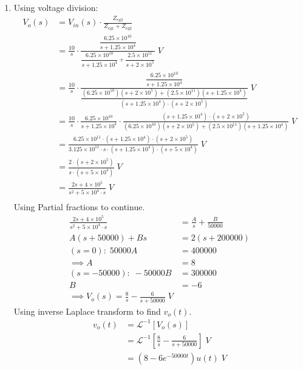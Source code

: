 \begin{enumerate}
	\item{
		Using voltage division:
		\begin{align*}
		V_o(s) &= V_{in}(s) \cdot \frac{Z_{eq2}}{Z_{eq1} + Z_{eq2}}\\
		&= \frac{10}{s} \cdot \frac{\dfrac{6.25 \times 10^{10}}				%
		{s + 1.25 \times 10^4}}{\dfrac{6.25 \times 10^{10}}					%
		{s + 1.25 \times 10^4} + \dfrac{2.5 \times 10^{11}}					%
		{s + 2 \times 10^5}} \; V\\
		&= \frac{10}{s} \cdot \frac{\dfrac{6.25 \times 10^{10}}             %
		{s+1.25 \times 10^4}}{\dfrac{(6.25 \times 10^{10})					%
		(s + 2\times 10^5) + (2.5 \times 10^{11})(s + 1.25 \times 10^4)}	%
		{(s + 1.25 \times 10^4)\cdot(s + 2 \times 10^5)}} \; V\\
		&= \frac{10}{s} \cdot \frac{6.25 \times 10^{10}}            
		{s+1.25 \times 10^4} \cdot \frac{(s + 1.25 \times 10^4)
		\cdot(s + 2 \times 10^5)}{(6.25 \times 10^{10})
		(s + 2\times 10^5) + (2.5 \times 10^{11})
		(s + 1.25 \times 10^4)} \; V\\
		&= \frac{6.25 \times 10^{11} \cdot (s + 1.25 \times 10^4) \cdot 
		(s + 2 \times 10^5)}{3.125 \times 10^{11} \cdot s \cdot 
		(s + 1.25 \times 10^4) \cdot (s + 5 \times 10^4)} \; V\\
		&= \frac{2 \cdot (s + 2 \times 10^5)}
		{s \cdot (s + 5 \times 10^4)} \; V\\
		&= \frac{2s + 4 \times 10^5}{s^2 + 5 \times 10^4 \cdot s} \; V\\
		\end{align*}
		Using Partial fractions to continue.
		\begin{align*}
		\frac{2s + 4 \times 10^5}{s^2 + 5 \times 10^4 \cdot s} &= 
		\frac{A}{s} + \frac{B}{50000}\\
		A(s+50000) + Bs &= 2(s + 200000)\\
		(s = 0): \; 50000A &= 400000\\
		\implies A &= 8\\
		(s = -50000): \;  -50000B &= 300000\\
		B &= -6\\
		\implies V_o(s) = \frac{8}{s} - \frac{6}{s + 50000} \; V
		\end{align*}
		Using inverse Laplace transform to find $v_o(t)$.
		\begin{align*}
		v_o(t) &= \mathcal{L}^{-1} [V_o(s)]\\
		&= \mathcal{L}^{-1} \left[\frac{8}{s} - \frac{6}{s + 50000}\right]\; V\\
		&= (8 -6 e^{-50000t})u(t)\;V
		\end{align*}
		\\
	}


\end{enumerate}
